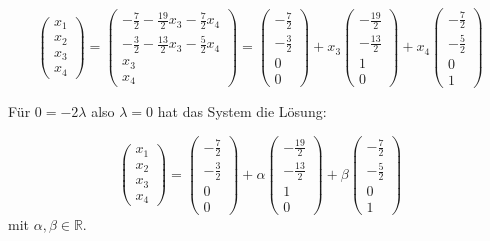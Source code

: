 \documentclass[a4paper,12pt]{article}
\begin{document}
\[
    \begin{pmatrix}
        x_1 \\x_2\\x_3\\x_4
    \end{pmatrix}=\begin{pmatrix}
        -\frac72-\frac{19}2x_3-\frac72x_4 \\-\frac32-\frac{13}2x_3-\frac52x_4\\x_3\\x_4
    \end{pmatrix}=\begin{pmatrix}
        -\frac72 \\-\frac32\\0\\0
    \end{pmatrix}+x_3\begin{pmatrix}
        -\frac{19}2 \\-\frac{13}2\\1\\0
    \end{pmatrix}+x_4\begin{pmatrix}
        -\frac72 \\-\frac52\\0\\1
    \end{pmatrix}
\]

Für $0=-2\lambda$ also $\lambda=0$ hat das System die Lösung:

\[
    \begin{pmatrix}
        x_1 \\x_2\\x_3\\x_4
    \end{pmatrix}=\begin{pmatrix}
        -\frac72 \\-\frac32\\0\\0
    \end{pmatrix}+\alpha\begin{pmatrix}
        -\frac{19}2 \\-\frac{13}2\\1\\0
    \end{pmatrix}+\beta\begin{pmatrix}
        -\frac72 \\-\frac52\\0\\1
    \end{pmatrix}\]
mit $\alpha,\beta\in\mathbb R$.
\end{document}
